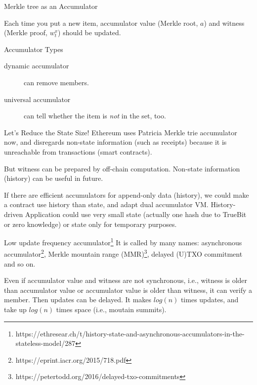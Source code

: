 \documentclass{beamer}
\begin{document}
\begin{frame}{Merkle tree as an Accumulator}
\begin{center}

\end{center}

Each time you put a new item, accumulator value (Merkle root, $a$) and witness (Merkle proof, $w^x_t$)
should be updated.
\end{frame}

\begin{frame}{Accumulator Types}
  \begin{description}
    \item[dynamic accumulator] can remove members.
    \item[universal accumulator] can tell whether the item is \emph{not} in the set, too.
  \end{description}
\end{frame}

\begin{frame}{Let's Reduce the State Size!}
Ethereum uses Patricia Merkle trie accumulator now, and disregards non-state
information (such as receipts) because it is unreachable from transactions (smart contracts).

But witness can be prepared by off-chain computation.
Non-state information (history) can be useful in future.

If there are efficient accumulators for append-only data (history), we could
make a contract use history than state, and adapt dual accumulator VM.
History-driven Application could use very small state (actually one hash due to
TrueBit or zero knowledge) or state only for temporary purposes.
\end{frame}

\begin{frame}{Low update frequency accumulator\footnote{https://ethresear.ch/t/history-state-and-asynchronous-accumulators-in-the-stateless-model/287}}
It is called by many names: asynchronous accumulator\footnote{https://eprint.iacr.org/2015/718.pdf},
Merkle mountain range (MMR)\footnote{https://petertodd.org/2016/delayed-txo-commitments}, delayed (U)TXO commitment and so on.

Even if accumulator value and witness are not synchronous, i.e.,
witness is older than accumulator value or
accumulator value is older than witness,
it can verify a member. Then updates can be delayed.
It makes $log(n)$ times updates, and take up $log(n)$ times space (i.e., moutain summits).
\end{frame}
\end{document}
